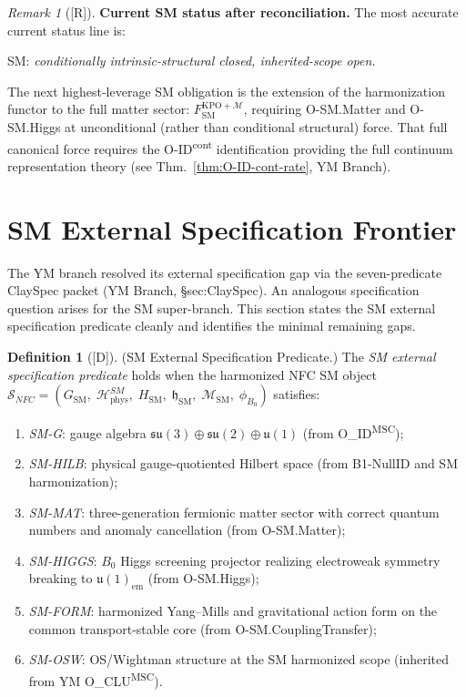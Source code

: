 \documentclass[12pt,oneside]{amsbook}
\theoremstyle{plain}
\theoremstyle{definition}
\newtheorem{definition}[theorem]{Definition}
\theoremstyle{remark}
\newtheorem{remark}[theorem]{Remark}
\newcommand{\status}[1]{\textup{[#1]}}
\begin{document}
\begin{remark}[\status{R}]\label{rem:sm-status-current}
\textbf{Current SM status after reconciliation.}
The most accurate current status line is:
\begin{center}
SM: \emph{conditionally intrinsic-structural closed, inherited-scope open.}
\end{center}
The next highest-leverage SM obligation is the extension of the
harmonization functor to the full matter sector:
$F_{\mathrm{SM}}^{\mathrm{KPO}+\mathcal{M}}$, requiring
O-SM.Matter and O-SM.Higgs at unconditional (rather than conditional
structural) force. That full canonical force requires the
O-ID\textsuperscript{cont} identification providing the full
continuum representation theory (see Thm.~\ref{thm:O-ID-cont-rate},
YM Branch).
\end{remark}

\section{SM External Specification Frontier}
\label{sec:sm-extspec}

The YM branch resolved its external specification gap via the
seven-predicate ClaySpec packet (YM Branch, §sec:ClaySpec). An
analogous specification question arises for the SM super-branch.
This section states the SM external specification predicate cleanly
and identifies the minimal remaining gaps.

\begin{definition}[\status{D}]\label{def:SM-extspec-predicate}
\textup{(SM External Specification Predicate.)}
The \emph{SM external specification predicate} holds when the
harmonized NFC SM object
$\mathcal{S}_{NFC} = (G_{\mathrm{SM}},\; \mathcal{H}_{\mathrm{phys}}^{SM},\;
H_{\mathrm{SM}},\; \mathfrak{h}_{\mathrm{SM}},\; \mathcal{M}_{\mathrm{SM}},\;
\phi_{B_0})$
satisfies:
\begin{enumerate}[label=\textup{(\arabic*)}]
 \item \emph{SM-G}: gauge algebra $\mathfrak{su}(3)\oplus
 \mathfrak{su}(2)\oplus\mathfrak{u}(1)$ (from O\_ID\textsuperscript{MSC});
 \item \emph{SM-HILB}: physical gauge-quotiented Hilbert space
 (from B1-NullID and SM harmonization);
 \item \emph{SM-MAT}: three-generation fermionic matter sector
 with correct quantum numbers and anomaly cancellation
 (from O-SM.Matter);
 \item \emph{SM-HIGGS}: $B_0$ Higgs screening projector realizing
 electroweak symmetry breaking to $\mathfrak{u}(1)_{\mathrm{em}}$
 (from O-SM.Higgs);
 \item \emph{SM-FORM}: harmonized Yang--Mills and gravitational
 action form on the common transport-stable core (from
 O-SM.CouplingTransfer);
 \item \emph{SM-OSW}: OS/Wightman structure at the SM harmonized
 scope (inherited from YM O\_CLU\textsuperscript{MSC}).
\end{enumerate}
\end{definition}
\end{document}

